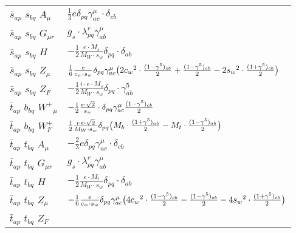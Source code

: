 \begin{center}
\begin{tabular}{|l|l|}
$\bar{s}{}_{a p }$ \phantom{-} $s{}_{b q }$ \phantom{-} ${A}_{\mu }$ \phantom{-}  &
	$\frac{1}{3} e\delta_{p q} \gamma_{a c}^\mu \cdot \delta_{c b} $\\[2mm]
$\bar{s}{}_{a p }$ \phantom{-} $s{}_{b q }$ \phantom{-} ${G}_{\mu r }$ \phantom{-}  &
	$ g_s\cdot \lambda_{p q}^r \gamma_{a b}^\mu $\\[2mm]
$\bar{s}{}_{a p }$ \phantom{-} $s{}_{b q }$ \phantom{-} ${H}_{}$ \phantom{-}  &
	$-\frac{1}{2}\frac{ e \cdot M_s}{ M_W \cdot s_w}\delta_{p q} \cdot \delta_{a b} $\\[2mm]
$\bar{s}{}_{a p }$ \phantom{-} $s{}_{b q }$ \phantom{-} ${Z}_{\mu }$ \phantom{-}  &
	$\frac{1}{6}\frac{ e}{ c_w \cdot s_w}\delta_{p q} \gamma_{a c}^\mu \big(2 c_w{}^2 \cdot {(1-\gamma^5)_{c b}\over 2} +{(1-\gamma^5)_{c b}\over 2} -2 s_w{}^2 \cdot {(1+\gamma^5)_{c b}\over 2} \big)$\\[2mm]
$\bar{s}{}_{a p }$ \phantom{-} $s{}_{b q }$ \phantom{-} $Z_F{}_{}$ \phantom{-}  &
	$-\frac{1}{2}\frac{ i \cdot e \cdot M_s}{ M_W \cdot s_w}\delta_{p q} \cdot \gamma_{a b}^5 $\\[2mm]
$\bar{t}{}_{a p }$ \phantom{-} $b{}_{b q }$ \phantom{-} $W^+{}_{\mu }$ \phantom{-}  &
	$-\frac{1}{2}\frac{ e \cdot\sqrt{2}}{ s_w}\cdot \delta_{p q} \gamma_{a c}^\mu {(1-\gamma^5)_{c b}\over 2} $\\[2mm]
$\bar{t}{}_{a p }$ \phantom{-} $b{}_{b q }$ \phantom{-} $W^+_F{}_{}$ \phantom{-}  &
	$\frac{1}{2}\frac{ i \cdot e \cdot\sqrt{2}}{ M_W \cdot s_w}\delta_{p q} \big( M_b\cdot {(1+\gamma^5)_{a b}\over 2} - M_t\cdot {(1-\gamma^5)_{a b}\over 2} \big)$\\[2mm]
$\bar{t}{}_{a p }$ \phantom{-} $t{}_{b q }$ \phantom{-} ${A}_{\mu }$ \phantom{-}  &
	$-\frac{2}{3} e\delta_{p q} \gamma_{a c}^\mu \cdot \delta_{c b} $\\[2mm]
$\bar{t}{}_{a p }$ \phantom{-} $t{}_{b q }$ \phantom{-} ${G}_{\mu r }$ \phantom{-}  &
	$ g_s\cdot \lambda_{p q}^r \gamma_{a b}^\mu $\\[2mm]
$\bar{t}{}_{a p }$ \phantom{-} $t{}_{b q }$ \phantom{-} ${H}_{}$ \phantom{-}  &
	$-\frac{1}{2}\frac{ e \cdot M_t}{ M_W \cdot s_w}\delta_{p q} \cdot \delta_{a b} $\\[2mm]
$\bar{t}{}_{a p }$ \phantom{-} $t{}_{b q }$ \phantom{-} ${Z}_{\mu }$ \phantom{-}  &
	$-\frac{1}{6}\frac{ e}{ c_w \cdot s_w}\delta_{p q} \gamma_{a c}^\mu \big(4 c_w{}^2 \cdot {(1-\gamma^5)_{c b}\over 2} -{(1-\gamma^5)_{c b}\over 2} -4 s_w{}^2 \cdot {(1+\gamma^5)_{c b}\over 2} \big)$\\[2mm]
$\bar{t}{}_{a p }$ \phantom{-} $t{}_{b q }$ \phantom{-} $Z_F{}_{}$ \phantom{-}  &

\end{tabular}
\end{center}
